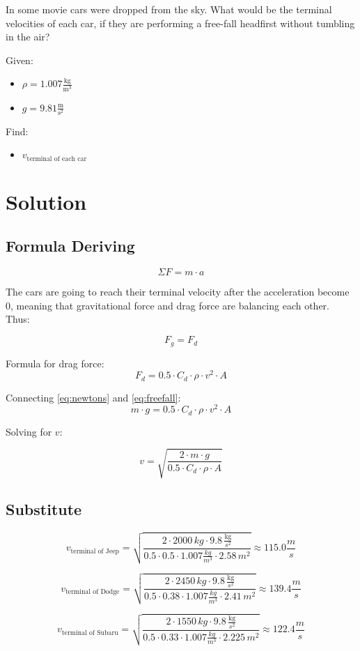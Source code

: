 
In some movie cars were dropped from the sky.
What would be the terminal velocities of each car, if they are
performing a free-fall headfirst without tumbling in the air?

\bigbreak Given:
\begin{itemize}
    \item $ \rho = 1.007 \frac{\text{kg}}{\text{m}^3} $
    \item $ g = 9.81 \frac{\text{m}}{\text{s}^2} $
\end{itemize}

Find:
\begin{itemize}
    \item $ v_{\text{terminal of each car}} $
\end{itemize}


\section*{Solution}
\subsection*{Formula Deriving}

\begin{equation}
    \label{eq:newtons}
    \Sigma F = m \cdot a
\end{equation}

The cars are going to reach their terminal velocity after the acceleration become 0,
meaning that gravitational force and drag force are balancing each other. Thus:

$$ F_g = F_d $$

Formula for drag force:
\begin{equation}
    \label{eq:freefall}
    F_d = 0.5 \cdot C_d \cdot \rho \cdot v^2 \cdot A
\end{equation}

Connecting \ref{eq:newtons} and \ref{eq:freefall}:
$$m \cdot g = 0.5 \cdot C_d \cdot \rho \cdot v^2 \cdot A $$

Solving for $v$:

\begin{equation}
    \label{eq:terminal}
    v = \sqrt{\frac{2 \cdot m \cdot g}{0.5 \cdot C_d \cdot \rho \cdot A}}
\end{equation}

\subsection*{Substitute}

$$ v_{\text{terminal of Jeep}} = \sqrt{\frac{2 \cdot 2000 \, kg \cdot 9.8 \, \frac{\text{kg}}{s^2}}{0.5 \cdot 0.5 \cdot 1.007 \frac{kg}{m^3} \cdot 2.58 \, m^2}} \approx 115.0 \frac{m}{s} $$

$$ v_{\text{terminal of Dodge}} = \sqrt{\frac{2 \cdot 2450 \, kg \cdot 9.8 \, \frac{\text{kg}}{s^2}}{0.5 \cdot 0.38 \cdot 1.007 \frac{kg}{m^3} \cdot 2.41 \, m^2}}  \approx 139.4 \frac{m}{s}$$ 

$$ v_{\text{terminal of Subaru}} = \sqrt{\frac{2 \cdot 1550 \, kg \cdot 9.8 \, \frac{\text{kg}}{s^2}}{0.5 \cdot 0.33 \cdot 1.007 \frac{kg}{m^3} \cdot 2.225 \, m^2}} \approx 122.4 \frac{m}{s}$$ 

